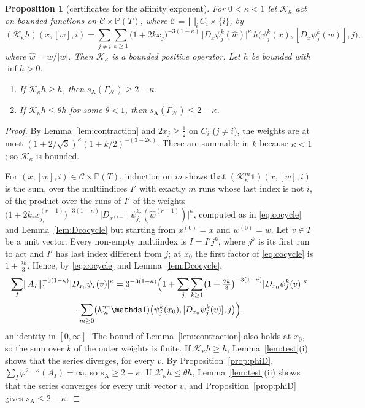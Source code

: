 \documentclass[11pt]{amsart}
\newtheorem{proposition}{Proposition}[section]
\theoremstyle{definition}
\theoremstyle{remark}
\newcommand{\GN}{\Gamma_{\mathcal N}}
\newcommand{\sA}{s_{\mathrm A}}
\newcommand{\abs}[1]{\lvert #1\rvert}
\newcommand{\norm}[1]{\lVert #1\rVert}
\newcommand{\cK}{\mathcal K}
\newcommand{\PT}{\mathbb P(T)}
\begin{document}
\begin{proposition}[certificates for the affinity exponent]
\label{cor:certA}
For $0<\kappa<1$ let $\cK_\kappa$ act on bounded functions on $\mathcal C\times\PT$, where $\mathcal C=\bigsqcup_iC_i\times\{i\}$, by
\[
  (\cK_\kappa h)(x,[w],i)=\sum_{j\neq i}\sum_{k\ge1}
  \bigl(1+2kx_j\bigr)^{-3(1-\kappa)}\,\abs{D_x\psi_j^k(\hat w)}^{\kappa}\,
  h\bigl(\psi_j^k(x),[D_x\psi_j^k(w)],j\bigr),
\]
where $\hat w=w/\abs w$. Then $\cK_\kappa$ is a bounded positive operator. 
Let $h$ be bounded with $\inf h>0$.
\begin{enumerate}
\item[(i)] If $\cK_\kappa h\ge h$, then $\sA(\GN)\ge2-\kappa$.
\item[(ii)] If $\cK_\kappa h\le\theta h$ for some $\theta<1$, then $\sA(\GN)\le2-\kappa$.
\end{enumerate}
\end{proposition}

\begin{proof}
By Lemma~\ref{lem:contraction} and $2x_j\ge\frac12$ on $C_i$ ($j\neq i$), the weights are
at most $(1+2/\sqrt3)^\kappa(1+k/2)^{-(3-2\kappa)}$. These are summable in $k$ because
$\kappa<1$; so $\cK_\kappa$ is bounded.

For $(x,[w],i)\in\mathcal C\times\PT$, induction on $m$ shows that $(\cK_\kappa^m\mathds 1)(x,[w],i)$ is the sum, over the multiindices $I'$ with exactly $m$ runs whose last index is not $i$, of the product over the runs of $I'$ of the weights $\bigl(1+2k_rx^{(r-1)}_{j_r}\bigr)^{-3(1-\kappa)}\abs{D_{x^{(r-1)}}\psi_{j_r}^{k_r}(\hat w^{(r-1)})}^\kappa$, computed as in \eqref{eq:cocycle} and Lemma~\ref{lem:Dcocycle} but starting from $x^{(0)}=x$ and $w^{(0)}=w$. Let $v\in T$ be a unit vector. Every non-empty multiindex is $I=I'j^k$, where $j^k$ is its first run to act and $I'$ has last index different from $j$; at $x_0$ the first factor of \eqref{eq:cocycle} is $1+\frac{2k}3$. Hence, by \eqref{eq:cocycle} and Lemma~\ref{lem:Dcocycle},
\begin{multline*}
  \sum_I\norm{A_I}_1^{-3(1-\kappa)}\abs{D_{x_0}\psi_I(v)}^\kappa
  =3^{-3(1-\kappa)}\Bigl(1+\sum_{j}\sum_{k\ge1}\bigl(1+\tfrac{2k}3\bigr)^{-3(1-\kappa)}
  \abs{D_{x_0}\psi_j^k(v)}^\kappa\\
  \cdot\sum_{m\ge0}(\cK_\kappa^m\mathds 1)\bigl(\psi_j^k(x_0),[D_{x_0}\psi_j^k(v)],j\bigr)\Bigr),
\end{multline*}
an identity in $[0,\infty]$. The bound of Lemma~\ref{lem:contraction} also holds at $x_0$, so the sum over $k$ of the outer weights
is finite.
If $\cK_\kappa h\ge h$, Lemma~\ref{lem:test}(i) shows that the series diverges, for every $v$. By
Proposition~\ref{prop:phiD}, $\sum_I\varphi^{2-\kappa}(A_I)=\infty$, so
$\sA\ge2-\kappa$. If $\cK_\kappa h\le\theta h$, Lemma~\ref{lem:test}(ii) shows that the series
converges for every unit vector $v$, and Proposition~\ref{prop:phiD} gives $\sA\le2-\kappa$.
\end{proof}
\end{document}

